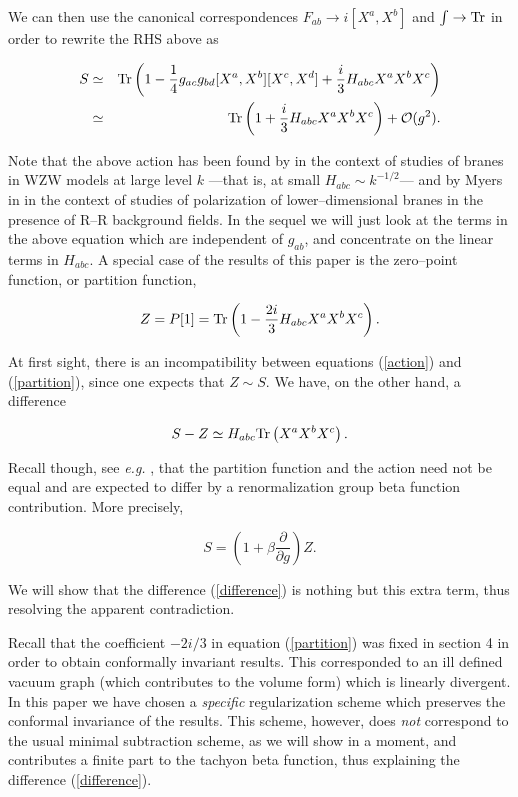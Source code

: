\documentclass[a4paper,11pt]{article}
\begin{document}
\noindent
We can then use the canonical correspondences $F_{ab} \to i [X^a,X^b]$ 
and $\int \to {\rm Tr}$ in order to rewrite the RHS above as

\begin{eqnarray} \label{action}
S &\simeq& {\rm Tr} \left(1 -\frac{1}{4} g_{ac}g_{bd} [X^a,X^b] 
[X^c,X^d] +
\frac{i}{3} H_{abc} X^a X^b X^c \right) \nonumber \\
&\simeq& {\rm Tr} \left(1 +
\frac{i}{3} H_{abc} X^a X^b X^c \right) + {\mathcal O}(g^2) .
\end{eqnarray}

\noindent
Note that the above action has been found by \cite{ARS-1, ARS-2} in the 
context of studies of branes in WZW models at large level $k$ ---that is, 
at small $H_{abc} \sim k^{-1/2}$--- and by Myers in \cite{Myers} in the 
context of studies of polarization of lower--dimensional branes in the 
presence of R--R background fields. In the sequel we will just look at the 
terms in the above equation which are independent of $g_{ab}$, and 
concentrate on the linear terms in $H_{abc}$. A special case of the results 
of this paper is the zero--point function, or partition function,

\begin{equation} \label{partition}
Z = P[1] =  {\rm Tr} \left(1 - \frac{2i}{3} H_{abc} X^a X^b X^c 
\right) .
\end{equation}

\noindent
At first sight, there is an incompatibility between equations 
(\ref{action}) and (\ref{partition}), since one expects that $Z \sim S$.
We have, on the other hand, a difference

\begin{equation} \label{difference}
S-Z \simeq   H_{abc} {\rm Tr} \left(X^a X^b X^c \right) .
\end{equation}

\noindent
Recall though, see \textit{e.g.} \cite{Witten-BSFT, Shatashvili-BSFT, 
Tseytlin-BSFT}, that the partition function and the action need not be 
equal and are expected to differ by a renormalization group beta 
function contribution. More precisely,

$$
S = (1+\beta\frac{\partial}{\partial g}) Z .
$$

\noindent
We will show that the difference (\ref{difference}) is nothing but this 
extra term, thus resolving the apparent contradiction.

Recall that the coefficient $-2i/3$ in equation (\ref{partition}) was fixed 
in section 4 in order to obtain conformally invariant results. This 
corresponded to an ill defined vacuum graph (which contributes to the
volume form) which is 
linearly divergent. In this paper we have chosen a {\it specific} 
regularization scheme which preserves the conformal invariance of 
the results. This scheme, however, does {\it not} correspond to the usual 
minimal subtraction scheme, as we will show in a moment, and contributes a 
finite part to the tachyon beta function, thus explaining the 
difference (\ref{difference}).
\end{document}
